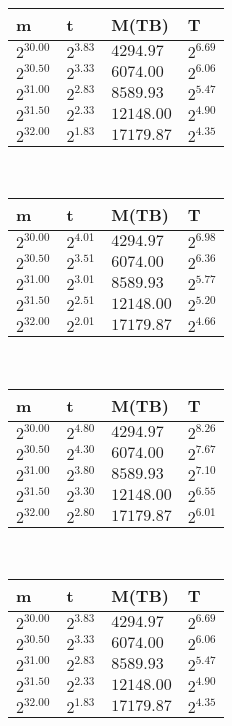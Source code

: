  \ 
\begin{tabular}{llll}
m & t & M(TB) & T \\ \hline
$2^{30.00}$ & $2^{3.83}$ & $4294.97$ & $2^{6.69}$ \\
$2^{30.50}$ & $2^{3.33}$ & $6074.00$ & $2^{6.06}$ \\
$2^{31.00}$ & $2^{2.83}$ & $8589.93$ & $2^{5.47}$ \\
$2^{31.50}$ & $2^{2.33}$ & $12148.00$ & $2^{4.90}$ \\
$2^{32.00}$ & $2^{1.83}$ & $17179.87$ & $2^{4.35}$ \\
\end{tabular}
 \ 
\begin{tabular}{llll}
m & t & M(TB) & T \\ \hline
$2^{30.00}$ & $2^{4.01}$ & $4294.97$ & $2^{6.98}$ \\
$2^{30.50}$ & $2^{3.51}$ & $6074.00$ & $2^{6.36}$ \\
$2^{31.00}$ & $2^{3.01}$ & $8589.93$ & $2^{5.77}$ \\
$2^{31.50}$ & $2^{2.51}$ & $12148.00$ & $2^{5.20}$ \\
$2^{32.00}$ & $2^{2.01}$ & $17179.87$ & $2^{4.66}$ \\
\end{tabular}
 \ 
\begin{tabular}{llll}
m & t & M(TB) & T \\ \hline
$2^{30.00}$ & $2^{4.80}$ & $4294.97$ & $2^{8.26}$ \\
$2^{30.50}$ & $2^{4.30}$ & $6074.00$ & $2^{7.67}$ \\
$2^{31.00}$ & $2^{3.80}$ & $8589.93$ & $2^{7.10}$ \\
$2^{31.50}$ & $2^{3.30}$ & $12148.00$ & $2^{6.55}$ \\
$2^{32.00}$ & $2^{2.80}$ & $17179.87$ & $2^{6.01}$ \\
\end{tabular}
 \ 
\begin{tabular}{llll}
m & t & M(TB) & T \\ \hline
$2^{30.00}$ & $2^{3.83}$ & $4294.97$ & $2^{6.69}$ \\
$2^{30.50}$ & $2^{3.33}$ & $6074.00$ & $2^{6.06}$ \\
$2^{31.00}$ & $2^{2.83}$ & $8589.93$ & $2^{5.47}$ \\
$2^{31.50}$ & $2^{2.33}$ & $12148.00$ & $2^{4.90}$ \\
$2^{32.00}$ & $2^{1.83}$ & $17179.87$ & $2^{4.35}$ \\
\end{tabular}
